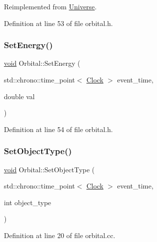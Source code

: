 Reimplemented from \mbox{\hyperlink{class_universe_aa22202ae740eb1355529afcb13285e91}{Universe}}.



Definition at line 53 of file orbital.\+h.

\mbox{\label{class_orbital_a20b0f4d549fd9024df89603a5adcc214}} 
\subsubsection{\texorpdfstring{Set\+Energy()}{SetEnergy()}}
{\footnotesize\ttfamily \mbox{\hyperlink{glad_8h_a950fc91edb4504f62f1c577bf4727c29}{void}} Orbital\+::\+Set\+Energy (\begin{DoxyParamCaption}\item[{std\+::chrono\+::time\+\_\+point$<$ \mbox{\hyperlink{universe_8h_a0ef8d951d1ca5ab3cfaf7ab4c7a6fd80}{Clock}} $>$}]{event\+\_\+time,  }\item[{double}]{val }\end{DoxyParamCaption})\hspace{0.3cm}{\ttfamily [inline]}}



Definition at line 54 of file orbital.\+h.

\mbox{\label{class_orbital_afd0dfd382d4bf7d9fbace315bd37fa85}} 
\subsubsection{\texorpdfstring{Set\+Object\+Type()}{SetObjectType()}}
{\footnotesize\ttfamily \mbox{\hyperlink{glad_8h_a950fc91edb4504f62f1c577bf4727c29}{void}} Orbital\+::\+Set\+Object\+Type (\begin{DoxyParamCaption}\item[{std\+::chrono\+::time\+\_\+point$<$ \mbox{\hyperlink{universe_8h_a0ef8d951d1ca5ab3cfaf7ab4c7a6fd80}{Clock}} $>$}]{event\+\_\+time,  }\item[{int}]{object\+\_\+type }\end{DoxyParamCaption})}



Definition at line 20 of file orbital.\+cc.

